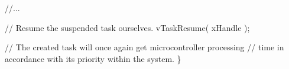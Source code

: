 \begin{DoxyPre}    //...\end{DoxyPre}



\begin{DoxyPre}    // Resume the suspended task ourselves.
    vTaskResume( xHandle );\end{DoxyPre}



\begin{DoxyPre}    // The created task will once again get microcontroller processing
    // time in accordance with its priority within the system.
\}
  \end{DoxyPre}
 